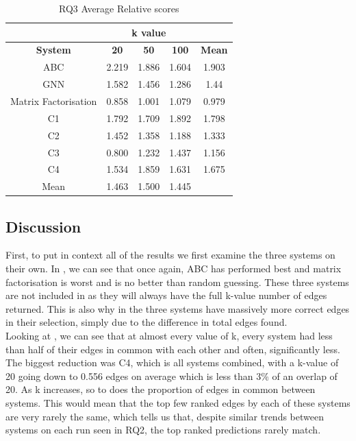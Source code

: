 \documentclass{l4proj}
\begin{document}
\begin{table}[h]
    \centering
    \caption{RQ3 Average Relative scores}
    \label{tab:rq3_score}
    \begin{tabular}{|c|c|c|c|c|}
    \hline
    & \multicolumn{3}{|c|}{k value} & \\ \hline
    \textbf{System} & \textbf{20} & \textbf{50} & \textbf{100} & \textbf{Mean}\\ \hline
    ABC & 2.219 & 1.886 & 1.604 & 1.903\\ \hline
    GNN & 1.582 & 1.456 & 1.286 & 1.44\\ \hline
    Matrix Factorisation & 0.858 & 1.001 & 1.079 & 0.979\\ \hline
    C1 & 1.792 & 1.709 & 1.892 & 1.798\\ \hline
    C2 & 1.452 & 1.358 & 1.188 & 1.333\\ \hline
    C3 & 0.800 & 1.232 & 1.437 & 1.156\\ \hline
    C4 & 1.534 & 1.859 & 1.631 & 1.675\\ \hline
    Mean & 1.463 & 1.500 & 1.445 & \\ \hline
    \end{tabular}
\end{table}

\subsection{Discussion}

First, to put in context all of the results we first examine the three systems on their own. In , we can see that once again, ABC has performed best and matrix factorisation is worst and is no better than random guessing. These three systems are not included in  as they will always have the full k-value number of edges returned. This is also why in  the three systems have massively more correct edges in their selection, simply due to the difference in total edges found. \\

Looking at , we can see that at almost every value of k, every system had less than half of their edges in common with each other and often, significantly less. The biggest reduction was C4, which is all systems combined, with a k-value of 20 going down to 0.556 edges on average which is less than 3\% of an overlap of 20. As k increases, so to does the proportion of edges in common between systems. This would mean that the top few ranked edges by each of these systems are very rarely the same, which tells us that, despite similar trends between systems on each run seen in RQ2, the top ranked predictions rarely match. \\
\end{document}
